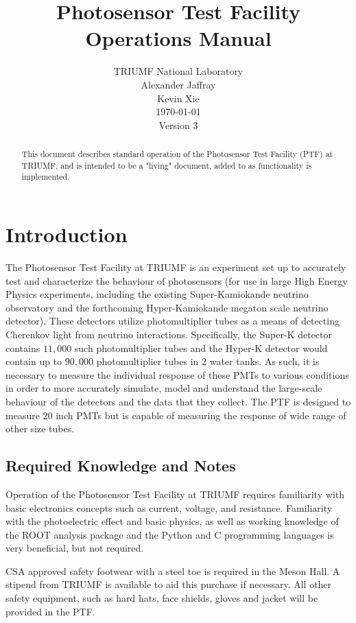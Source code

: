 \documentclass[twoside,letterpaper]{refart}
\title{Photosensor Test Facility Operations Manual}
\author{TRIUMF National Laboratory \\
Alexander Jaffray \\
Kevin Xie \\
{\today}  \\
Version 3}
\date{}
\begin{document}
\maketitle

\begin{abstract}
        This document describes standard operation of the Photosensor Test Facility (PTF) at TRIUMF, and is intended to be a "living" document, added to as functionality is implemented.  
\end{abstract}
\tableofcontents

\newpage



\section{Introduction}

The Photosensor Test Facility at TRIUMF is an experiment set up to accurately test and characterize the behaviour of photosensors (for use in large High Energy Physics experiments, including the existing Super-Kamiokande neutrino observatory and the forthcoming Hyper-Kamiokande megaton scale neutrino detector). These detectors utilize photomultiplier tubes as a means of detecting Cherenkov light from neutrino interactions.  Specifically, the Super-K detector contains $11,000$ such photomultiplier tubes and the Hyper-K detector would contain up to $90,000$ photomultiplier tubes in 2 water tanks.  As such, it is necessary to measure the individual response of these PMTs to various conditions in order to more accurately simulate, model and understand the large-scale behaviour of the detectors and the data that they collect. The PTF is designed to measure 20 inch PMTs but is capable of measuring the response of wide range of other size tubes. 

\subsection{Required Knowledge and Notes}

Operation of the Photosensor Test Facility at TRIUMF requires familiarity with basic electronics concepts such as current, voltage, and resistance. Familiarity with the photoelectric effect and basic physics, as well as working knowledge of the ROOT analysis package and the Python and C programming languages is very beneficial, but not required. 

CSA approved safety footwear with a steel toe is required in the Meson Hall. A stipend from TRIUMF is available to aid this purchase if necessary. All other safety equipment, such as hard hats, face shields, gloves and jacket will be provided in the PTF. 
\end{document}

